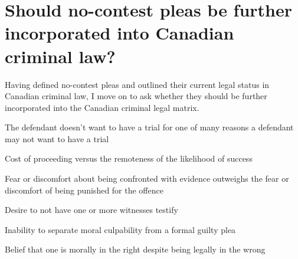 \chapter{Should no-contest pleas be further incorporated into Canadian criminal law?}

Having defined no-contest pleas and outlined their current legal status in Canadian criminal law, I move on to ask whether they should be further incorporated into the Canadian criminal legal matrix. 

The defendant doesn't want to have a trial for one of many reasons a defendant may not want to have a trial

Cost of proceeding versus the remoteness of the likelihood of success

Fear or discomfort about being confronted with evidence outweighs the fear or discomfort of being punished for the offence

Desire to not have one or more witnesses testify

Inability to separate moral culpability from a formal guilty plea

Belief that one is morally in the right despite being legally in the wrong